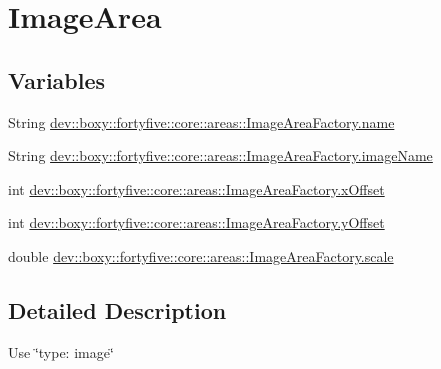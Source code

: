 \hypertarget{group___image_area}{
\section{ImageArea}
\label{d5/d15/group___image_area}
}
\subsection*{Variables}
\begin{DoxyCompactItemize}
\item 
String \hyperlink{group___image_area_gaa9289d9690489b0fd14e7091530970b7}{dev::boxy::fortyfive::core::areas::ImageAreaFactory.name}
\item 
String \hyperlink{group___image_area_ga8438aa6e7397dd740b77fe0fbf660936}{dev::boxy::fortyfive::core::areas::ImageAreaFactory.imageName}
\item 
int \hyperlink{group___image_area_ga8f5f4265e2db6213e49b143287bdb5d9}{dev::boxy::fortyfive::core::areas::ImageAreaFactory.xOffset}
\item 
int \hyperlink{group___image_area_ga7741b37a22cdb63f6448186c06f61d05}{dev::boxy::fortyfive::core::areas::ImageAreaFactory.yOffset}
\item 
double \hyperlink{group___image_area_ga8bf0ff1badd6a9a4c2244a555f24406b}{dev::boxy::fortyfive::core::areas::ImageAreaFactory.scale}
\end{DoxyCompactItemize}


\subsection{Detailed Description}
Use \char`\"{}type: image\char`\"{} 

